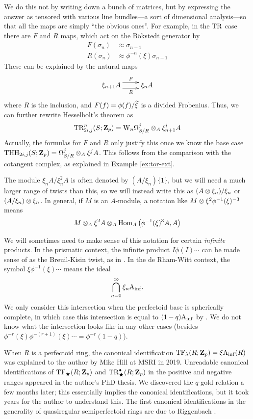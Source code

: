 \begin{notation}
  We do this not by writing down a bunch of matrices, but by expressing the answer as tensored with various line bundles---a sort of dimensional analysis---so that all the maps are simply ``the obvious ones''. For example, in the $\TR$ case there are $F$ and $R$ maps, which act on the B\"okstedt generator by
  \begin{align*}
    F(\sigma_n) &\approx \sigma_{n-1}\\
    R(\sigma_n) &\approx \phi^{-n}(\xi)\sigma_{n-1}
  \end{align*}
  These can be explained by the natural maps
  \[\xymatrix{
      \xi_{n+1} A \ar@<1ex>[r]^-F \ar@<-1ex>[r]_-R & \xi_n A
  }\]
  where $R$ is the inclusion, and $F(f)=\phi(f)/\~\xi$ is a divided Frobenius. Thus, we can further rewrite Hesselholt's theorem as
  \[ \TR^n_{2i,j}(S;\Z_p) = \dRW[n]^j_{S/R} \tnsr_A \xi_{n+1}^i A \]
  Actually, the formulas for $F$ and $R$ only justify this once we know the base case $\THH_{2i,j}(S;\Z_p) = \Omega^j_{S/R} \tnsr_A \xi^j A$. This follows from the comparison with the cotangent complex, as explained in Example \ref{ex:tor-ext}.

  The module $\xi_nA/\xi_n^2A$ is often denoted by $(A/\xi_n)\{1\}$, but we will need a much larger range of twists than this, so we will instead write this as $(A\tnsr \xi_n)/\xi_n$ or $(A/\xi_n) \tnsr \xi_n$. In general, if $M$ is an $A$-module, a notation like $M \tnsr \xi^2 \phi^{-1}(\xi)^{-3}$ means
  \[ M \tnsr_A \xi^2A \tnsr_A \Hom_A\left(\phi^{-1}(\xi)^3A,A\right) \]

We will sometimes need to make sense of this notation for certain \emph{infinite} products. In the prismatic context, the infinite product $I\phi(I)\dotsm$ can be made sense of as the Breuil-Kisin twist, as in \cite[]{APC}. In the de Rham-Witt context, the symbol $\xi\phi^{-1}(\xi)\dotsm$ means the ideal
  \[ \bigcap_{n=0}^\infty \xi_n \Ainf. \]
  We only consider this intersection when the perfectoid base is spherically complete, in which case this intersection is equal to $(1-q)\Ainf$ by \cite[Lemma 3.23]{BMS1}. We do not know what the intersection looks like in any other cases (besides $\phi^{-r}(\xi)\phi^{-(r+1)}(\xi)\dotsm = \phi^{-r}(1-q)$).

  When $R$ is a perfectoid ring, the canonical identification $\TF_{\lambda}(R;\Z_p) = \xi\Ainf(R)$ was explained to the author by Mike Hill at MSRI in 2019. Unreadable canonical identifications of $\TF_\rog(R;\Z_p)$ and $\TR^\bullet_\rog(R;\Z_p)$ in the positive and negative ranges appeared in the author's PhD thesis. We discovered the $q$-gold relation \cite[Lemma 4.9]{SulSliceTHH} a few months later; this essentially implies the canonical identifications, but it took years for the author to understand this. The first canonical identifications in the generality of quasiregular semiperfectoid rings are due to Riggenbach \cite{RiggenbachTruncated}.
\end{notation}

